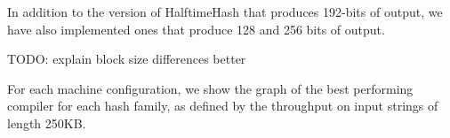 \documentclass[sigconf, nonacm]{acmart}
\begin{document}
In addition to the version of HalftimeHash that produces 192-bits of output, we have also implemented ones that produce 128 and 256 bits of output.

TODO: explain block size differences better


For each machine configuration, we show the graph of the best performing compiler for each hash family, as defined by the throughput on input strings of length 250KB.





\end{document}
